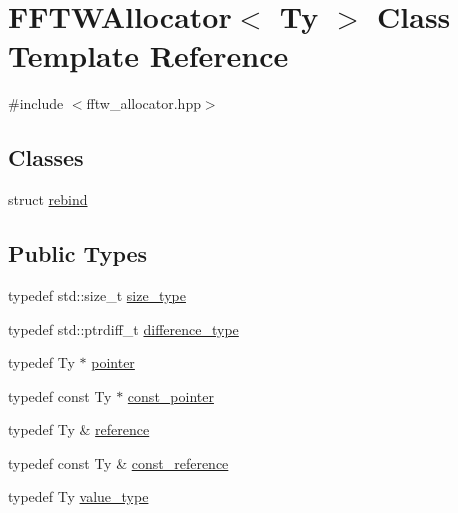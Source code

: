 \hypertarget{class_f_f_t_w_allocator}{\section{F\-F\-T\-W\-Allocator$<$ Ty $>$ Class Template Reference}
\label{class_f_f_t_w_allocator}
}


{\ttfamily \#include $<$fftw\-\_\-allocator.\-hpp$>$}

\subsection*{Classes}
\begin{DoxyCompactItemize}
\item 
struct \hyperlink{struct_f_f_t_w_allocator_1_1rebind}{rebind}
\end{DoxyCompactItemize}
\subsection*{Public Types}
\begin{DoxyCompactItemize}
\item 
typedef std\-::size\-\_\-t \hyperlink{class_f_f_t_w_allocator_a74c8fd5a39d426623d89320b57195bdd}{size\-\_\-type}
\item 
typedef std\-::ptrdiff\-\_\-t \hyperlink{class_f_f_t_w_allocator_a34bdb68f487106d45488ea733006cb58}{difference\-\_\-type}
\item 
typedef Ty $\ast$ \hyperlink{class_f_f_t_w_allocator_ac868161c4c2d0193981575f2b9544208}{pointer}
\item 
typedef const Ty $\ast$ \hyperlink{class_f_f_t_w_allocator_a71836314e7780aa80122a04ba06a2e82}{const\-\_\-pointer}
\item 
typedef Ty \& \hyperlink{class_f_f_t_w_allocator_a54261f01b9a1fcd6608f9129f969387d}{reference}
\item 
typedef const Ty \& \hyperlink{class_f_f_t_w_allocator_ad6bfad7e0412d7f234b573e6cc5cf4ce}{const\-\_\-reference}
\item 
typedef Ty \hyperlink{class_f_f_t_w_allocator_af48e61e5c4fce705af675694acb3518e}{value\-\_\-type}
\end{DoxyCompactItemize}
